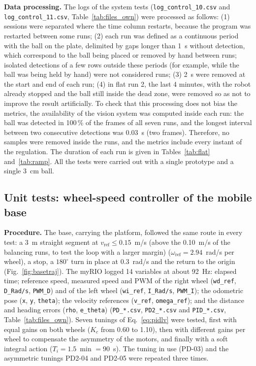 \documentclass[11pt,letterpaper]{article}
\begin{document}
\textbf{Data processing.} The logs of the system tests
(\texttt{log\_control\_10.csv} and \texttt{log\_control\_11.csv},
Table~\ref{tab:files_own}) were processed as follows: (1) sessions were
separated where the time column restarts, because the program was
restarted between some runs; (2) each run was defined as a continuous
period with the ball on the plate, delimited by gaps longer than 1~s
without detection, which correspond to the ball being placed or removed
by hand between runs; isolated detections of a few rows outside these
periods (for example, while the ball was being held by hand) were not
considered runs; (3) 2~s were removed at the start and end of each run;
(4) in flat run 2, the last 4 minutes, with the robot already stopped
and the ball still inside the dead zone, were removed so as not to
improve the result artificially. To check that this processing does
not bias the metrics, the availability of the vision system was
computed inside each run: the ball was detected in 100\,\% of the
frames of all seven runs, and the longest interval between two
consecutive detections was 0.03~s (two frames). Therefore, no samples
were removed inside the runs, and the metrics include every instant of
the regulation. The duration of each run is given in
Tables~\ref{tab:flat} and~\ref{tab:ramp}. All the tests were carried
out with a single prototype and a single 3~cm ball.

\subsection{Unit tests: wheel-speed controller of the mobile base}
\label{sec:wheel}
\textbf{Procedure.} The base, carrying the platform, followed the same
route in every test: a 3~m straight segment at $v_{\mathrm{ref}}\le
0.15$~m/s (above the 0.10~m/s of the balancing runs, to test the loop
with a larger margin) ($\omega_{\mathrm{ref}}=2.94$~rad/s per wheel), a stop, a
$180^\circ$ turn in place at 0.3~rad/s and the return to the origin
(Fig.~\ref{fig:basetraj}). The myRIO logged 14 variables at about 92~Hz: elapsed time; reference
speed, measured speed and PWM of the right wheel
(\texttt{wd\_ref}, \texttt{D\_Rad/s}, \texttt{PWM\_D}) and of the left
wheel (\texttt{wi\_ref}, \texttt{I\_Rad/s}, \texttt{PWM\_I}); the
odometric pose (\texttt{x}, \texttt{y}, \texttt{theta}); the velocity
references (\texttt{v\_ref}, \texttt{omega\_ref}); and the distance and
heading errors (\texttt{rho}, \texttt{e\_theta}) (\texttt{PD\_*.csv}, \texttt{PD2\_*.csv}
and \texttt{PID\_*.csv}, Table~\ref{tab:files_own}). Seven tunings of
Eq.~\eqref{eq:pidlv} were tested, first with equal gains on both wheels
($K_c$ from 0.60 to 1.10), then with different gains per wheel to
compensate the asymmetry of the motors, and finally with a soft integral
action ($T_i=1.5$~min $=90$~s). The tuning in use (PD-03) and the asymmetric tunings PD2-04 and
PD2-05 were repeated three times.
\end{document}
